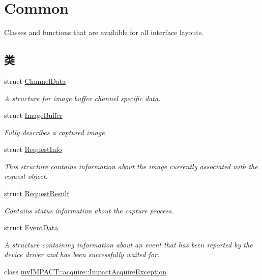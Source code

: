 \hypertarget{group___common_interface}{\section{Common}
\label{group___common_interface}
}


Classes and functions that are available for all interface layouts.  


\subsection*{类}
\begin{DoxyCompactItemize}
\item 
struct \hyperlink{struct_channel_data}{Channel\+Data}
\begin{DoxyCompactList}\small\item\em A structure for image buffer channel specific data. \end{DoxyCompactList}\item 
struct \hyperlink{struct_image_buffer}{Image\+Buffer}
\begin{DoxyCompactList}\small\item\em Fully describes a captured image. \end{DoxyCompactList}\item 
struct \hyperlink{struct_request_info}{Request\+Info}
\begin{DoxyCompactList}\small\item\em This structure contains information about the image currently associated with the request object. \end{DoxyCompactList}\item 
struct \hyperlink{struct_request_result}{Request\+Result}
\begin{DoxyCompactList}\small\item\em Contains status information about the capture process. \end{DoxyCompactList}\item 
struct \hyperlink{struct_event_data}{Event\+Data}
\begin{DoxyCompactList}\small\item\em A structure containing information about an event that has been reported by the device driver and has been successfully waited for. \end{DoxyCompactList}\item 
class \hyperlink{classmv_i_m_p_a_c_t_1_1acquire_1_1_impact_acquire_exception}{mv\+I\+M\+P\+A\+C\+T\+::acquire\+::\+Impact\+Acquire\+Exception}

\end{DoxyCompactItemize}
